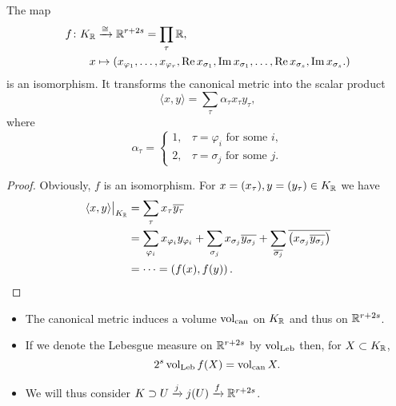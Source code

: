 \begin{Prop}
The map
\begin{align*}
f \colon K_{\mathbb{R}} &\xrightarrow{\cong} \mathbb{R}^{r+2s} = \prod_\tau \mathbb{R}, \\
x & \mapsto \left( x_{\varphi_1}, \dots, x_{\varphi_r}, \operatorname{Re} x_{\sigma_1} , \operatorname{Im} x_{\sigma_1}, \dots, \operatorname{Re} x_{\sigma_s} , \operatorname{Im} x_{\sigma_s}.
\right)
\end{align*}
is an isomorphism. It transforms the canonical metric into the scalar product
\[ \langle x, y \rangle = \sum_\tau \alpha_\tau x_\tau y_\tau,
\]
where \[
\alpha_\tau = \begin{cases}
1, & \tau = \varphi_i \text{ for some } i, \\
2, & \tau = \sigma_j \text{ for some } j.
\end{cases}
\]
\end{Prop}

\begin{proof}
Obviously, $f$ is an isomorphism. For $x=(x_\tau), y =(y_\tau) \in K_{\mathbb{R}}$ we have
\begin{align*}
\langle x, y \rangle \big|_{K_{\mathbb{R}}}
&= \sum_\tau x_\tau \overline{y_\tau} \\
&= \sum_{\varphi_i} x_{\varphi_i} y_{\varphi_i}
	+\sum_{\sigma_j} x_{\sigma_j} \overline{y_{\sigma_j}}
	+\sum_{\overline{\sigma_j}} \overline{\left(x_{\sigma_j} \overline{y_{\sigma_j}}\right)} \\
&= \cdots = \left( f(x), f(y) \right).
\end{align*}
\end{proof}

\begin{Bem*}
\begin{itemize}
\item The canonical metric induces a volume $\operatorname{\operatorname{vol}_{can}}$ on $K_{\mathbb{R}}$ and thus on $\mathbb{R}^{r+2s}$.
\item If we denote the Lebesgue measure on $\mathbb{R}^{r+2s}$ by $\operatorname{\operatorname{vol}_{\operatorname{Leb}}}$  then, for $X \subset K_{\mathbb{R}}$,
\[ 2^{s} \operatorname{\operatorname{vol}_{\operatorname{Leb}}} f(X) = \operatorname{\operatorname{vol}_{can}} X.
\]
\item We will thus consider $ K \supset U \xrightarrow{j} j(U) \xrightarrow{f} \mathbb{R}^{r+2s}$.
\end{itemize}
\end{Bem*}


















